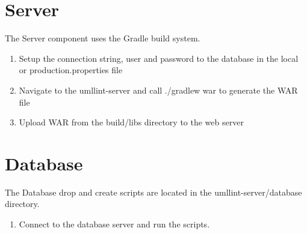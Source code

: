 \section{Server}
The Server component uses the Gradle build system.
\begin{enumerate}
  \item Setup the connection string, user and password to the database in the local or production.properties file
  \item Navigate to the umllint-server and call ./gradlew war to generate the WAR file
  \item Upload WAR from the build/libs directory to the web server
\end{enumerate}

\section{Database}
The Database drop and create scripts are located in the umllint-server/database directory.
\begin{enumerate}
  \item Connect to the database server and run the scripts.
\end{enumerate}